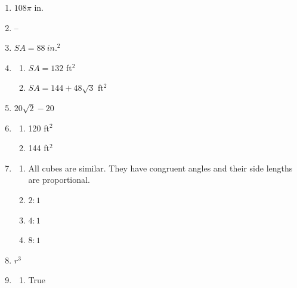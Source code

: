 \documentclass{article}
\begin{document}
\begin{enumerate}
\begin{enumerate}
	\end{enumerate}

\item $108 \pi$ in.

\item --

\item $SA = 88 \ in.^2$

\item
	
	\begin{enumerate}
	
	\item $SA = 132$ ft$^2$
	
	\item $SA = 144 + 48\sqrt{3}$ ft$^2$
	
	\end{enumerate}
	
\item $20\sqrt{2} - 20$

\item

	\begin{enumerate}
	
	\item 120 ft$^2$
	
	\item 144 ft$^2$
	
	\end{enumerate}
	
\item

	\begin{enumerate}
	
	\item All cubes are similar. They have congruent angles and their side lengths are proportional.
	
	\item $2:1$
	
	\item $4:1$
	
	\item $8:1$
	
	\end{enumerate}
	
\item $r^3$

\item

	\begin{enumerate}
	
	\item True
	

\end{enumerate}
\end{enumerate}
\end{document}
